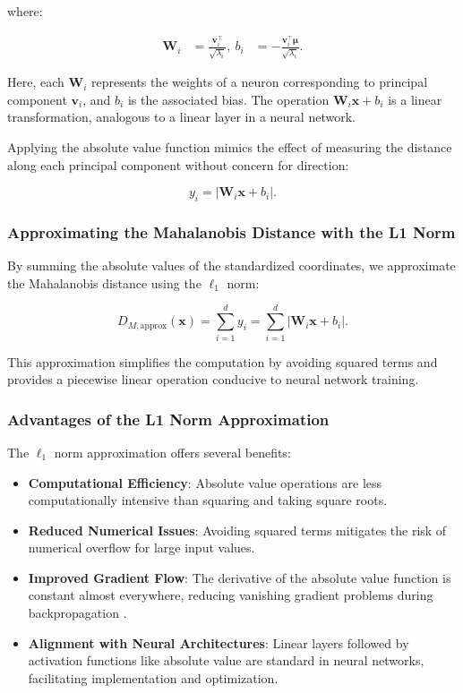 where:

\begin{align} \label{eq
} \mathbf{W}_i &= \frac{ \mathbf{v}_i^\top }{ \sqrt{\lambda_i} }, \ b_i &= - \frac{ \mathbf{v}_i^\top \boldsymbol{\mu} }{ \sqrt{\lambda_i} }. \end{align}

Here, each $\mathbf{W}_i$ represents the weights of a neuron corresponding to principal component $\mathbf{v}_i$, and $b_i$ is the associated bias. The operation $\mathbf{W}_i \mathbf{x} + b_i$ is a linear transformation, analogous to a linear layer in a neural network.

Applying the absolute value function mimics the effect of measuring the distance along each principal component without concern for direction:

\begin{equation} \label{eq
} y_i = | \mathbf{W}_i \mathbf{x} + b_i |. \end{equation}

\subsubsection{Approximating the Mahalanobis Distance with the L1 Norm}

By summing the absolute values of the standardized coordinates, we approximate the Mahalanobis distance using the $\ell_1$ norm:

\begin{equation} \label{eq
} D_{M, \text{approx}}(\mathbf{x}) = \sum_{i=1}^d y_i = \sum_{i=1}^d | \mathbf{W}_i \mathbf{x} + b_i |. \end{equation}

This approximation simplifies the computation by avoiding squared terms and provides a piecewise linear operation conducive to neural network training.

\subsubsection{Advantages of the L1 Norm Approximation}

The $\ell_1$ norm approximation offers several benefits:

\begin{itemize} \item \textbf{Computational Efficiency}: Absolute value operations are less computationally intensive than squaring and taking square roots. \item \textbf{Reduced Numerical Issues}: Avoiding squared terms mitigates the risk of numerical overflow for large input values. \item \textbf{Improved Gradient Flow}: The derivative of the absolute value function is constant almost everywhere, reducing vanishing gradient problems during backpropagation \cite{hochreiter1998vanishing}. \item \textbf{Alignment with Neural Architectures}: Linear layers followed by activation functions like absolute value are standard in neural networks, facilitating implementation and optimization. \end{itemize}

